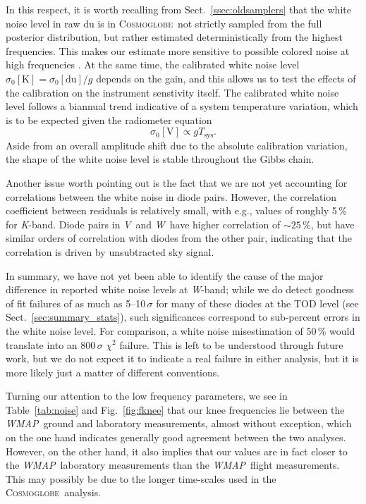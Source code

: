 \documentclass[twocolumn]{../../common/aa}
\def\WMAP{\emph{WMAP}}
\newcommand{\cosmoglobe}{\textsc{Cosmoglobe}}
\newcommand{\K}[0]{\textit K}
\newcommand{\V}[0]{\textit V}
\newcommand{\W}[0]{\textit W}
\begin{document}
In this respect, it is worth recalling from Sect.~\ref{ssec:oldsamplers} that the white noise level in raw du is in \cosmoglobe\ not strictly sampled from the full posterior distribution, but rather estimated deterministically from the highest frequencies. This makes our estimate more sensitive to possible colored noise at high frequencies \citep{bp17}. At the same time, the calibrated white noise level $\sigma_0[\mathrm K]=\sigma_0[\mathrm{du}]/g$ depends on the gain, and this  allows us to test the effects of the calibration on the instrument senstivity itself. The calibrated white noise level follows a biannual trend indicative of a system temperature variation, which is to be expected given the radiometer equation
\begin{equation}
	\sigma_0[\mathrm V]\propto gT_\mathrm{sys}.
\end{equation}
Aside from an overall amplitude shift due to the absolute calibration variation, the shape of the white noise level is stable throughout the Gibbs chain.

Another issue worth pointing out is the fact that we are not yet accounting for correlations between the white noise in diode pairs. However, the correlation coefficient between residuals is relatively small, with e.g., values of roughly 5\,\% for \K-band. Diode pairs in \V\ and \W\ have higher correlation of $\sim25\,\%$, but have similar orders of correlation with diodes from the other pair, indicating that the correlation is driven by unsubtracted sky signal.

In summary, we have not yet been able to identify the cause of the major difference in reported white noise levels at \W-band; while we do detect goodness of fit failures of as much as 5--10\,$\sigma$ for many of these diodes at the TOD level (see Sect.~\ref{sec:summary_stats}), such significances correspond to sub-percent errors in the white noise level. For comparison, a white noise misestimation of 50\,\% would translate into an 800\,$\sigma$ $\chi^2$ failure. This is left to be understood through future work, but we do not expect it to indicate a real failure in either analysis, but it is more likely just a matter of different conventions.

Turning our attention to the low frequency parameters, we see in Table~\ref{tab:noise} and Fig.~\ref{fig:fknee} that our knee frequencies lie between the \WMAP\ ground and laboratory measurements, almost without exception, which on the one hand indicates generally good agreement between the two analyses. However, on the other hand, it also implies that our values are in fact closer to the \WMAP\ laboratory measurements than the \WMAP\ flight measurements. This may possibly be due to the longer time-scales used in the \cosmoglobe\ analysis.
\end{document}
